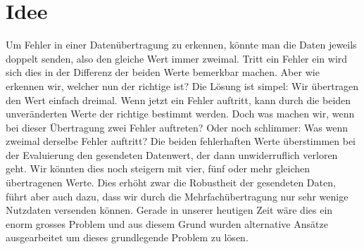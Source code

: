 %
%
\section{Idee
\label{reedsolomon:section:idee}}
Um Fehler in einer Datenübertragung zu erkennen, könnte man die Daten jeweils doppelt senden,
also den gleiche Wert immer zweimal. 
Tritt ein Fehler ein wird sich dies in der Differenz der beiden Werte bemerkbar machen.
Aber wie erkennen wir, welcher nun der richtige ist? Die Lösung ist simpel: Wir übertragen den Wert einfach dreimal.
Wenn jetzt ein Fehler auftritt, kann durch die beiden unveränderten Werte der richtige bestimmt werden.
Doch was machen wir, wenn bei dieser Übertragung zwei Fehler auftreten? 
Oder noch schlimmer: Was wenn zweimal derselbe Fehler auftritt? Die beiden fehlerhaften Werte überstimmen bei der Evaluierung den gesendeten Datenwert, der dann unwiderruflich verloren geht. 
Wir könnten dies noch steigern mit vier, fünf oder mehr gleichen übertragenen Werte. Dies erhöht zwar die Robustheit der gesendeten Daten, führt aber auch dazu, dass wir durch die Mehrfachübertragung nur sehr wenige Nutzdaten versenden können.
Gerade in unserer heutigen Zeit wäre dies ein enorm grosses Problem und aus diesem Grund wurden alternative Ansätze ausgearbeitet um dieses grundlegende Problem zu lösen. 
%
%
%
%
%
%
%
%
%
%
% 
%
%
%
%
%

